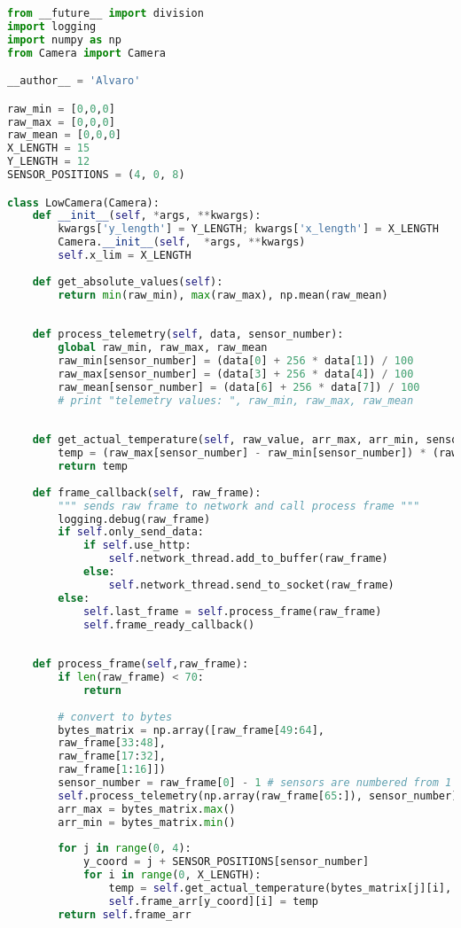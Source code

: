 \documentclass[hidelinks,11pt,a4paper,oneside,article]{memoir}
\begin{document}
\begin{lstlisting}[label={listing:lowcamera},caption={Processing of the Low camera},language=Python, style=styleprogramming]
from __future__ import division
import logging
import numpy as np
from Camera import Camera

__author__ = 'Alvaro'

raw_min = [0,0,0]
raw_max = [0,0,0]
raw_mean = [0,0,0]
X_LENGTH = 15
Y_LENGTH = 12
SENSOR_POSITIONS = (4, 0, 8)

class LowCamera(Camera):
    def __init__(self, *args, **kwargs):
        kwargs['y_length'] = Y_LENGTH; kwargs['x_length'] = X_LENGTH
        Camera.__init__(self,  *args, **kwargs)
        self.x_lim = X_LENGTH
    
    def get_absolute_values(self):
        return min(raw_min), max(raw_max), np.mean(raw_mean)
    
    
    def process_telemetry(self, data, sensor_number):
        global raw_min, raw_max, raw_mean
        raw_min[sensor_number] = (data[0] + 256 * data[1]) / 100
        raw_max[sensor_number] = (data[3] + 256 * data[4]) / 100
        raw_mean[sensor_number] = (data[6] + 256 * data[7]) / 100
        # print "telemetry values: ", raw_min, raw_max, raw_mean
    
    
    def get_actual_temperature(self, raw_value, arr_max, arr_min, sensor_number):
        temp = (raw_max[sensor_number] - raw_min[sensor_number]) * (raw_value / (arr_max - arr_min)) + raw_min[sensor_number]
        return temp
    
    def frame_callback(self, raw_frame):
        """ sends raw frame to network and call process frame """
        logging.debug(raw_frame)
        if self.only_send_data:
            if self.use_http:
                self.network_thread.add_to_buffer(raw_frame)
            else:
                self.network_thread.send_to_socket(raw_frame)
        else:
            self.last_frame = self.process_frame(raw_frame)
            self.frame_ready_callback()
    
    
    def process_frame(self,raw_frame):
        if len(raw_frame) < 70:
            return
    
        # convert to bytes
        bytes_matrix = np.array([raw_frame[49:64],
        raw_frame[33:48],
        raw_frame[17:32],
        raw_frame[1:16]])
        sensor_number = raw_frame[0] - 1 # sensors are numbered from 1 to 3, must subtract 1
        self.process_telemetry(np.array(raw_frame[65:]), sensor_number)
        arr_max = bytes_matrix.max()
        arr_min = bytes_matrix.min()
        
        for j in range(0, 4):
            y_coord = j + SENSOR_POSITIONS[sensor_number]
            for i in range(0, X_LENGTH):
                temp = self.get_actual_temperature(bytes_matrix[j][i], arr_max, arr_min, sensor_number)
                self.frame_arr[y_coord][i] = temp
        return self.frame_arr
\end{lstlisting}
\end{document}
